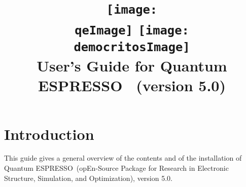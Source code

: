 \documentclass[12pt,a4paper]{article}
\def\version{5.0}
\def\qe{{\sc Quantum ESPRESSO}}
\begin{document}
 
\author{}
\date{}

\def\qeImage{quantum_espresso.pdf}
\def\democritosImage{democritos.pdf}

\begin{htmlonly}
\def\qeImage{quantum_espresso.png}
\def\democritosImage{democritos.png}
\end{htmlonly}

\title{
  \texttt{[image: \\qeImage]} \hskip 2cm
  \texttt{[image: \\democritosImage]}\\
  \vskip 1cm
  \Huge User's Guide for \qe\ \smallskip
  \Large (version \version)
}


\maketitle

\tableofcontents

\section{Introduction}

This guide gives a general overview of the contents and of the installation 
of \qe\ (opEn-Source Package for Research in Electronic Structure, Simulation,
and Optimization), version \version.
\end{document}
